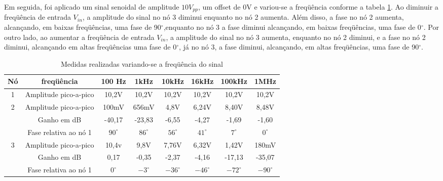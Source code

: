 \documentclass[a4paper]{article} %
\begin{document}
Em seguida, foi aplicado um sinal senoidal de amplitude $10V_{pp}$, um offset de 0V e variou-se a freqüência conforme a tabela \ref{tab:var-freq}. 
Ao diminuir a freqüência de entrada $V_{in}$, a amplitude do sinal no nó 3 diminui enquanto no nó 2 aumenta. Além disso, a fase no nó 2 aumenta, alcançando, em baixas freqüências, uma fase de 90$^{\circ}$,enquanto no nó 3 a fase diminui alcançando, em baixas freqüências, uma fase de  0$^{\circ}$.
Por outro lado, ao aumentar a freqüência de entrada $V_{in}$, a amplitude do sinal no nó 3 aumenta, enquanto no nó 2 diminui, e a fase no nó 2 diminui, alcançando em altas freqüências uma fase de 0$^{\circ}$, já no nó 3, a fase diminui, alcançando, em altas freqüências, uma fase de 90$^{\circ}$.   

%
\begin{table}[h]
\begin{centering}
\begin{tabular}{|c|c|c|c|c|c|c|c|}
\hline 
Nó & freqüência & 100 Hz & 1kHz & 10kHz & 16kHz & 100kHz & 1MHz\tabularnewline
\hline
\hline 
1 & Amplitude pico-a-pico & 10,2V & 10,2V  & 10,2V & 10,2V & 10,2V  &10,2V \tabularnewline
\hline 
\multirow{3}{*}{2}
 & Amplitude pico-a-pico & 100mV & 656mV & 4,8V & 6,24V & 8,40V & 8,48V \tabularnewline
\cline{2-8} 
 & \multicolumn{1}{c|}{Ganho em dB} & -40,17 & -23,83  & -6,55 & -4,27  & -1,69  & -1,60 \tabularnewline
\cline{2-8} 

 & Fase relativa ao nó 1 & $90^{\circ}$ & $86^{\circ}$  & $56^{\circ}$  & $41^{\circ}$  & $7^{\circ}$  & $0^{\circ}$ \tabularnewline
\hline 
\multirow{3}{*}{3}
 & Amplitude pico-a-pico & 10,4v & 9,8V & 7,76V & 6,32V  & 1,42V  & 180mV \tabularnewline
\cline{2-8} 
 
 & Ganho em dB &  0,17 & -0,35  & -2,37 & -4,16 & -17,13 & -35,07\tabularnewline
\cline{2-8} 
 
 & Fase relativa ao nó 1 & $0^{\circ}$ & $-3^{\circ}$ & $-36^{\circ}$  & $-46^{\circ}$  & $-72^{\circ}$  & $-90^{\circ}$ \tabularnewline
\hline
\end{tabular}
\par\end{centering}

\caption{Medidas realizadas variando-se a freqüência do sinal \label{tab:var-freq}}
\end{table}
\end{document}
